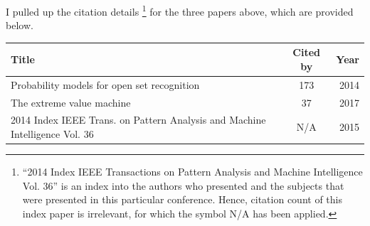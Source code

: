 \documentclass[journal]{IEEEtran}
\begin{document}
I pulled up the citation details \footnote{``2014 Index IEEE Transactions on Pattern Analysis and Machine Intelligence Vol. 36'' is an index into the authors who presented and the subjects that were presented in this particular conference. Hence, citation count of this index paper is irrelevant, for which the symbol N/A has been applied.} for the three papers above, which are provided below.  

\begin{center}
	\begin{tabular}{ |l|c|r| } 
		\hline
		{\footnotesize \textbf{Title}} & {\footnotesize \textbf{Cited by}} & {\footnotesize \textbf{Year}}\\
		\hline
		{\tiny Probability models for open set recognition \cite{article162}} & {\tiny 173} & {\tiny 2014} \\ 
		\hline
		{\tiny The extreme value machine \cite{article163}} & {\tiny 37} & {\tiny 2017} \\ 
		\hline
		{\tiny 2014 Index IEEE Trans. on Pattern Analysis and Machine Intelligence Vol. 36 \cite{article164}} & {\tiny N/A} & {\tiny 2015} \\ 
		\hline		
	\end{tabular}
\end{center} 

\vspace{5mm}

 
  

	
\end{document}

